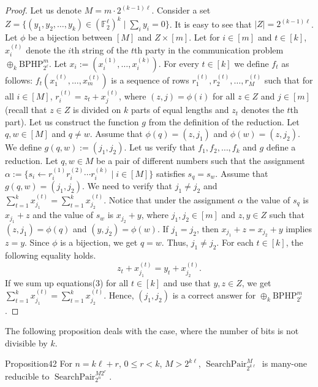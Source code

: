 \begin{proof}
Let us denote $M=m\cdot2^{(k-1)\ell}$. Consider a set
$Z=\{(y_1,y_2,\ldots,y_k)\in(\mathbb F_2^\ell)^k\mid\sum_iy_i=0\}$.
It is easy to see that $|Z|=2^{(k-1)\ell}$. Let $\phi$ be a bijection between $[M]$ and $Z\times[m]$.
Let for $i\in[m]$ and $t\in[k]$, $x_i^{(t)}$ denote the $i$th string of the $t$th party in the communication problem $\oplus_k\mathrm{BPHP}_{2^\ell}^m$. Let $x_i:=(x_i^{(1)},\ldots,x_i^{(k)})$.
For every $t\in[k]$ we define $f_t$ as follows: $f_t(x_1^{(t)},\ldots,x_m^{(t)})$ is a sequence of rows $r_1^{(t)},r_2^{(t)},\ldots,r_M^{(t)}$ such that for all $i\in[M]$, $r_i^{(t)}=z_t+x_j^{(t)}$, where $(z,j)=\phi(i)$ for all $z\in Z$ and $j\in[m]$ (recall that $z\in Z$ is divided on $k$ parts of equal lengths and $z_t$ denotes the $t$th part).
Let us construct the function $g$ from the definition of the reduction.
Let $q,w\in[M]$ and $q\ne w$. Assume that $\phi(q)=(z,j_1)$ and $\phi(w)=(z,j_2)$. We define $g(q,w):=(j_1,j_2)$.
Let us verify that $f_1,f_2,\ldots,f_k$ and $g$ define a reduction. Let $q,w\in M$ be a pair of different numbers such that the assignment $\alpha:=\{s_i\leftarrow r_i^{(1)}r_i^{(2)}\cdots r_i^{(k)}\mid i\in[M]\}$ satisfies $s_q=s_w$.
Assume that $g(q,w)=(j_1,j_2)$. We need to verify that $j_1\ne j_2$ and $\sum_{t=1}^kx_{j_1}^{(t)}=\sum_{t=1}^kx_{j_2}^{(t)}$.
Notice that under the assignment $\alpha$ the value of $s_q$ is $x_{j_1}+z$ and the value of $s_w$ is $x_{j_2}+y$, where $j_1,j_2\in[m]$ and $z,y\in Z$ such that $(z,j_1)=\phi(q)$ and $(y,j_2)=\phi(w)$. If $j_1=j_2$, then $x_{j_1}+z=x_{j_2}+y$ implies $z=y$. Since $\phi$ is a bijection, we get $q=w$. Thus, $j_1\ne j_2$.
For each $t\in[k]$, the following equality holds.
\begin{equation}
z_t+x_{j_1}^{(t)}=y_t+x_{j_2}^{(t)}.\tag{3}
\end{equation}
If we sum up equations(3) for all $t\in[k]$ and use that $y,z\in Z$, we get $\sum_{t=1}^kx_{j_1}^{(t)}=\sum_{t=1}^kx_{j_2}^{(t)}$. Hence, $(j_1,j_2)$ is a correct answer for $\oplus_k\mathrm{BPHP}_{2^\ell}^m$.
\end{proof}
The following proposition deals with the case, where the number of bits is not divisible by $k$.
\begin{authorclaim}{Proposition42}
For $n=k\ell+r$, $0\le r<k$, $M>2^{k\ell}$, $\operatorname{SearchPair}_{2^{k\ell}}^M$ is many-one reducible to $\operatorname{SearchPair}_{2^n}^{M2^r}$.
\end{authorclaim}

